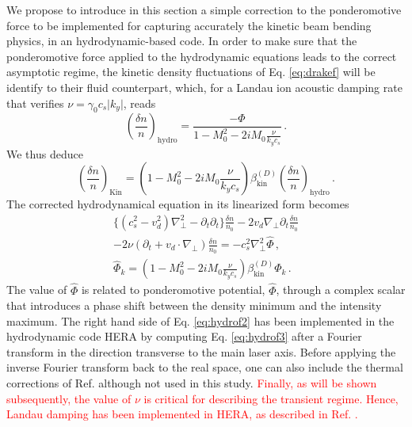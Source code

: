 \documentclass[%
 reprint,
 amsmath,amssymb,
 aps,
]{revtex4-1}
\begin{document}
We propose to introduce in this section a simple correction to the ponderomotive force to be implemented for capturing accurately the kinetic beam bending physics, in an hydrodynamic-based code. 
In order to make sure that the ponderomotive force applied to the hydrodynamic equations leads to the correct asymptotic regime, the kinetic density fluctuations of Eq. \eqref{eq:drakef}  will be identify to their fluid counterpart, which, for a Landau ion acoustic   damping rate that verifies $\nu=\gamma_0c_s \vert k_y\vert$, reads 
\begin{equation}
\left(\frac{\delta n}{n}\right)_\mathrm{hydro} =\frac{-\Phi}{1-M_0^2 -2i M_0 \frac{\nu}{k_y c_s}} \, .
\end{equation} 
We thus deduce 
\begin{equation}
\left(\frac{\delta n}{n}\right)_\mathrm{Kin} =\left(1-M_0^2 -2iM_0\frac{\nu}{k_y c_s} \right) \beta_\mathrm{kin}^{(D)} 
\left(\frac{\delta n}{n}\right)_\mathrm{hydro}\, .
\end{equation} 
The corrected hydrodynamical equation in its linearized form becomes 
\begin{align}
 \{ (c_s^2-v_d^2)\nabla_\perp^2 -\partial_t \partial_t\}    \frac{  \delta n }{n_0} - 2 v_d \nabla_\perp  \partial_t \frac{  \delta n }{n_0}   \nonumber \\
-2\nu  (\partial_t + v_d  \cdot\nabla_\perp) \frac{  \delta n }{n_0}   = - c_s^2\nabla_\perp^2 \hat{\Phi} \, , \label{eq:hydrof2} \\
 \hat{\Phi}_k  =\left(1-M_0^2 -2iM_0\frac{\nu}{k_y c_s}\right)    \beta_\mathrm{kin}^{(D)} \Phi_k  \, .\label{eq:hydrof3} 
\end{align}
The value of $\hat{\Phi}$ is related to ponderomotive potential, $\hat{\Phi}$, through a complex scalar that introduces a phase shift between the density minimum and the intensity maximum. The right hand side of Eq. \eqref{eq:hydrof2} has been implemented in the hydrodynamic  code HERA  by computing Eq. \eqref{eq:hydrof3} after a Fourier transform in the direction transverse to the main laser axis. Before applying the inverse Fourier transform back to the real space, one can also include the thermal corrections of Ref. \cite[]{Bychenkov_2000} although not used in this study.
\textcolor{red}{Finally, as will be shown subsequently, the value of $\nu$  is critical for describing  the transient regime. Hence, Landau damping has been implemented in HERA, as described in Ref. \cite[]{harmony}.}
\end{document}
